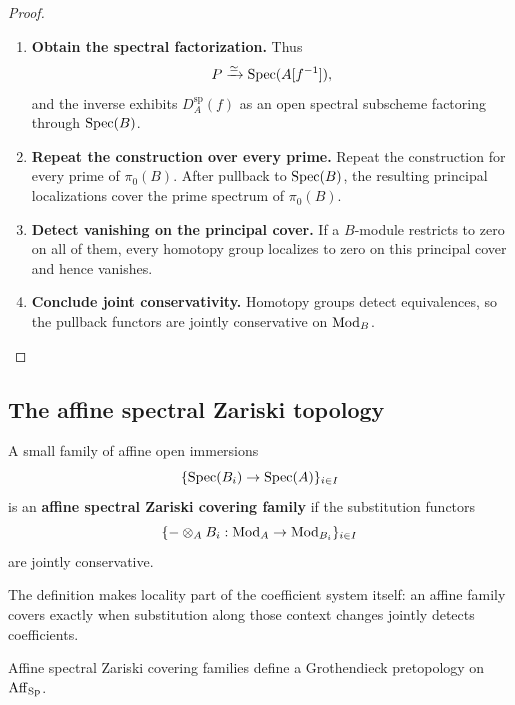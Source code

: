\begin{proof}
\begin{enumerate}[label=\textup{(\arabic*)}]
    \item \textbf{Obtain the spectral factorization.}
    Thus
    \[
        P\xrightarrow{\simeq}\operatorname{Spec}(A[f^{-1}]),
    \]
    and the inverse exhibits \(D_A^{\mathrm{sp}}(f)\) as an open spectral
    subscheme factoring through \(\operatorname{Spec}(B)\).

    \item \textbf{Repeat the construction over every prime.}
    Repeat the construction for every prime of \(\pi_0(B)\). After pullback
    to \(\operatorname{Spec}(B)\), the resulting principal localizations cover the prime
    spectrum of \(\pi_0(B)\).

    \item \textbf{Detect vanishing on the principal cover.}
    If a \(B\)-module restricts to zero on all of
    them, every homotopy group localizes to zero on this principal cover and
    hence vanishes.

    \item \textbf{Conclude joint conservativity.}
    Homotopy groups detect equivalences, so the pullback
    functors are jointly conservative on \(\operatorname{Mod}_B\).
\end{enumerate}
\end{proof}

\subsection{The affine spectral Zariski topology}

\begin{definition}
\label{def:affine-zariski-cover}
A small family of affine open immersions
\[
    \{\operatorname{Spec}(B_i)\to\operatorname{Spec}(A)\}_{i\in I}
\]
is an \textbf{affine spectral Zariski covering family} if the substitution
functors
\[
    \{-\otimes_AB_i:\operatorname{Mod}_A\to\operatorname{Mod}_{B_i}\}_{i\in I}
\]
are jointly conservative.
\end{definition}

The definition makes locality part of the coefficient system itself: an
affine family covers exactly when substitution along those context changes
jointly detects coefficients.

\begin{proposition}
\label{prop:spectral-zariski-pretopology}
Affine spectral Zariski covering families define a Grothendieck pretopology
on \(\operatorname{Aff}_{\operatorname{Sp}}\).
\end{proposition}

